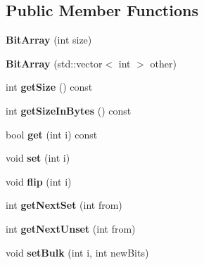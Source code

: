 \subsection*{Public Member Functions}
\begin{DoxyCompactItemize}
\item 
\mbox{\label{classzxing_1_1_bit_array_abc35dc8a81b1b7611a5fea656029df32}} 
{\bfseries Bit\+Array} (int size)
\item 
\mbox{\label{classzxing_1_1_bit_array_abe098e95e96cc603258e170d649c23ff}} 
{\bfseries Bit\+Array} (std\+::vector$<$ int $>$ other)
\item 
\mbox{\label{classzxing_1_1_bit_array_afb2559c02b5f8d09fdcb4981fc470653}} 
int {\bfseries get\+Size} () const
\item 
\mbox{\label{classzxing_1_1_bit_array_a4629389abfcafec83d8eafe0bd7d6f30}} 
int {\bfseries get\+Size\+In\+Bytes} () const
\item 
\mbox{\label{classzxing_1_1_bit_array_a9ac1ec5ad42526c153c1f28962a7718c}} 
bool {\bfseries get} (int i) const
\item 
\mbox{\label{classzxing_1_1_bit_array_a3a26b64addba7f37bd0dda284d256e2d}} 
void {\bfseries set} (int i)
\item 
\mbox{\label{classzxing_1_1_bit_array_a88b490fb2af2e19d6e176c5f090b482e}} 
void {\bfseries flip} (int i)
\item 
\mbox{\label{classzxing_1_1_bit_array_ae275bdc061ee811e08d68ba7491aa3d0}} 
int {\bfseries get\+Next\+Set} (int from)
\item 
\mbox{\label{classzxing_1_1_bit_array_a71b0721488f1628cb51329a69fd6b5a1}} 
int {\bfseries get\+Next\+Unset} (int from)
\item 
\mbox{\label{classzxing_1_1_bit_array_acc5f6d59296ee4f97118ad6028172eeb}} 
void {\bfseries set\+Bulk} (int i, int new\+Bits)

\end{DoxyCompactItemize}
